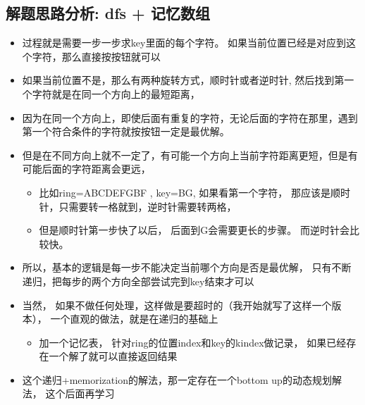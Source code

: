 \documentclass[9pt, b5paaper]{book}
\begin{document}
\subsection{解题思路分析: dfs + 记忆数组}
\label{sec-1-14-3}
\begin{itemize}
\item 过程就是需要一步一步求key里面的每个字符。 如果当前位置已经是对应到这个字符，那么直接按按钮就可以
\item 如果当前位置不是，那么有两种旋转方式，顺时针或者逆时针, 然后找到第一个字符就是在同一个方向上的最短距离，
\item 因为在同一个方向上，即使后面有重复的字符，无论后面的字符在那里，遇到第一个符合条件的字符就按按钮一定是最优解。
\item 但是在不同方向上就不一定了，有可能一个方向上当前字符距离更短，但是有可能后面的字符距离会更远，
\begin{itemize}
\item 比如ring=ABCDEFGBF , key=BG, 如果看第一个字符， 那应该是顺时针，只需要转一格就到，逆时针需要转两格，
\item 但是顺时针第一步快了以后， 后面到G会需要更长的步骤。 而逆时针会比较快。
\end{itemize}
\item 所以，基本的逻辑是每一步不能决定当前哪个方向是否是最优解， 只有不断递归，把每步的两个方向全部尝试完到key结束才可以
\item 当然， 如果不做任何处理，这样做是要超时的（我开始就写了这样一个版本）， 一个直观的做法，就是在递归的基础上
\begin{itemize}
\item 加一个记忆表， 针对ring的位置index和key的kindex做记录， 如果已经存在一个解了就可以直接返回结果
\end{itemize}
\item 这个递归+memorization的解法，那一定存在一个bottom up的动态规划解法， 这个后面再学习
\end{itemize}
\end{document}
